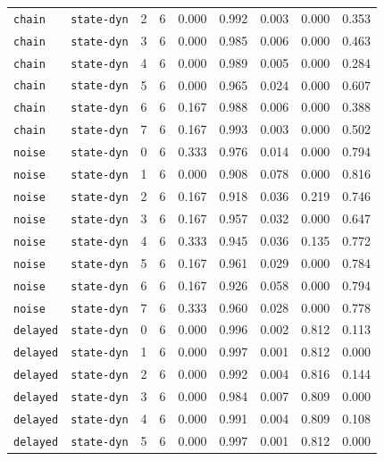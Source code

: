 \documentclass{article}
\begin{document}
\begin{center}
\begin{tabular}{lllcccccc}
\texttt{chain} & \texttt{state-dyn} & 2 & 6 & 0.000 & 0.992 & 0.003 & 0.000 & 0.353 \\
\texttt{chain} & \texttt{state-dyn} & 3 & 6 & 0.000 & 0.985 & 0.006 & 0.000 & 0.463 \\
\texttt{chain} & \texttt{state-dyn} & 4 & 6 & 0.000 & 0.989 & 0.005 & 0.000 & 0.284 \\
\texttt{chain} & \texttt{state-dyn} & 5 & 6 & 0.000 & 0.965 & 0.024 & 0.000 & 0.607 \\
\texttt{chain} & \texttt{state-dyn} & 6 & 6 & 0.167 & 0.988 & 0.006 & 0.000 & 0.388 \\
\texttt{chain} & \texttt{state-dyn} & 7 & 6 & 0.167 & 0.993 & 0.003 & 0.000 & 0.502 \\
\texttt{noise} & \texttt{state-dyn} & 0 & 6 & 0.333 & 0.976 & 0.014 & 0.000 & 0.794 \\
\texttt{noise} & \texttt{state-dyn} & 1 & 6 & 0.000 & 0.908 & 0.078 & 0.000 & 0.816 \\
\texttt{noise} & \texttt{state-dyn} & 2 & 6 & 0.167 & 0.918 & 0.036 & 0.219 & 0.746 \\
\texttt{noise} & \texttt{state-dyn} & 3 & 6 & 0.167 & 0.957 & 0.032 & 0.000 & 0.647 \\
\texttt{noise} & \texttt{state-dyn} & 4 & 6 & 0.333 & 0.945 & 0.036 & 0.135 & 0.772 \\
\texttt{noise} & \texttt{state-dyn} & 5 & 6 & 0.167 & 0.961 & 0.029 & 0.000 & 0.784 \\
\texttt{noise} & \texttt{state-dyn} & 6 & 6 & 0.167 & 0.926 & 0.058 & 0.000 & 0.794 \\
\texttt{noise} & \texttt{state-dyn} & 7 & 6 & 0.333 & 0.960 & 0.028 & 0.000 & 0.778 \\
\texttt{delayed} & \texttt{state-dyn} & 0 & 6 & 0.000 & 0.996 & 0.002 & 0.812 & 0.113 \\
\texttt{delayed} & \texttt{state-dyn} & 1 & 6 & 0.000 & 0.997 & 0.001 & 0.812 & 0.000 \\
\texttt{delayed} & \texttt{state-dyn} & 2 & 6 & 0.000 & 0.992 & 0.004 & 0.816 & 0.144 \\
\texttt{delayed} & \texttt{state-dyn} & 3 & 6 & 0.000 & 0.984 & 0.007 & 0.809 & 0.000 \\
\texttt{delayed} & \texttt{state-dyn} & 4 & 6 & 0.000 & 0.991 & 0.004 & 0.809 & 0.108 \\
\texttt{delayed} & \texttt{state-dyn} & 5 & 6 & 0.000 & 0.997 & 0.001 & 0.812 & 0.000 \\
\bottomrule
\end{tabular}
\end{center}
\end{document}
